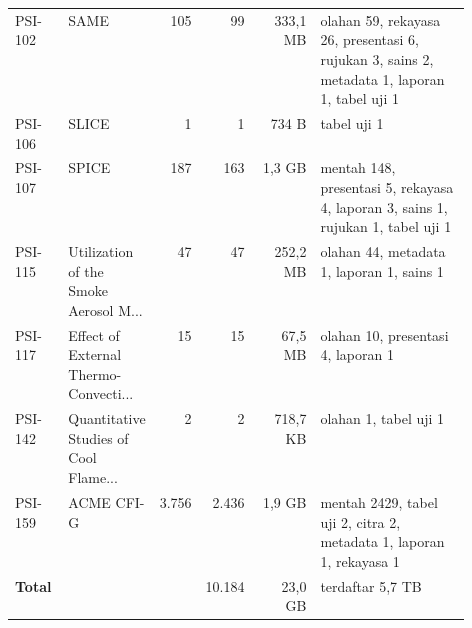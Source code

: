 \begin{longtable}{@{}l >{\raggedright\arraybackslash}p{0.2\linewidth} r r r >{\raggedright\arraybackslash}p{0.33\linewidth}@{}}
PSI-102 & SAME & 105 & 99 & 333,1 MB & olahan 59, rekayasa 26, presentasi 6, rujukan 3, sains 2, metadata 1, laporan 1, tabel uji 1\\
PSI-106 & SLICE & 1 & 1 & 734 B & tabel uji 1\\
PSI-107 & SPICE & 187 & 163 & 1,3 GB & mentah 148, presentasi 5, rekayasa 4, laporan 3, sains 1, rujukan 1, tabel uji 1\\
PSI-115 & Utilization of the Smoke Aerosol M... & 47 & 47 & 252,2 MB & olahan 44, metadata 1, laporan 1, sains 1\\
PSI-117 & Effect of External Thermo-Convecti... & 15 & 15 & 67,5 MB & olahan 10, presentasi 4, laporan 1\\
PSI-142 & Quantitative Studies of Cool Flame... & 2 & 2 & 718,7 KB & olahan 1, tabel uji 1\\
PSI-159 & ACME CFI-G & 3.756 & 2.436 & 1,9 GB & mentah 2429, tabel uji 2, citra 2, metadata 1, laporan 1, rekayasa 1\\
\midrule
\multicolumn{2}{l}{\textbf{Total}} & 16.372 & 10.184 & 23,0 GB & terdaftar 5,7 TB\\
\end{longtable}
